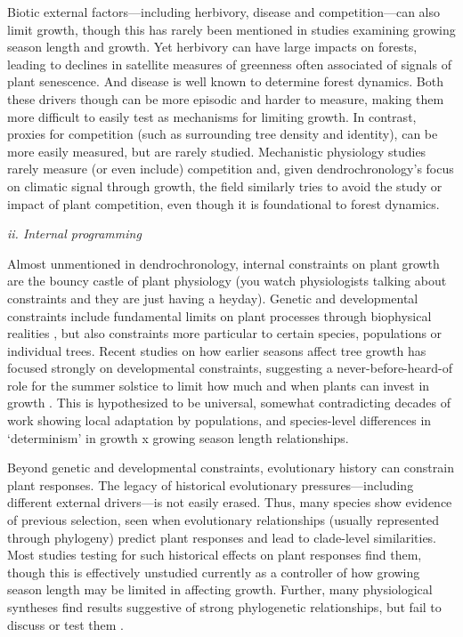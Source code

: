 \documentclass[11pt]{article}
\begin{document}
Biotic external factors---including herbivory, disease and competition---can also limit growth, though this has rarely been mentioned in studies examining growing season length and growth. Yet herbivory can have large impacts on forests, leading to declines in satellite measures of greenness often associated of signals of plant senescence. And disease is well known to determine forest dynamics. Both these drivers though can be more episodic and harder to measure, making them more difficult to easily test as mechanisms for limiting growth. In contrast, proxies for competition (such as surrounding tree density and identity), can be more easily measured, but are rarely studied. Mechanistic physiology studies rarely measure (or even include) competition and, given dendrochronology's focus on climatic signal through growth, the field similarly tries to avoid the study or impact of plant competition, even though it is foundational to forest dynamics. 

\emph{ii. Internal programming}

Almost unmentioned in dendrochronology, internal constraints on plant growth are the bouncy castle of plant physiology (you watch physiologists talking about constraints and they are just having a heyday). Genetic and developmental constraints include fundamental limits on plant processes through biophysical realities \citep[e.g., allometry, chemical reaction limits, and genetic architecture that may limit what trait combinations are possible,][]{ackerly2000evolution}, but also constraints more particular to certain species, populations or individual trees. Recent studies on how earlier seasons affect tree growth has focused strongly on developmental constraints, suggesting a never-before-heard-of role for the summer solstice to limit how much and when plants can invest in growth \citep{zohner2023effect}. This is hypothesized to be universal, somewhat contradicting decades of work showing local adaptation by populations, and species-level differences in `determinism' in growth x growing season length relationships. 

Beyond genetic and developmental constraints, evolutionary history can constrain plant responses. The legacy of historical evolutionary pressures---including different external drivers---is not easily erased.  Thus, many species show evidence of previous selection, seen when evolutionary relationships (usually represented through phylogeny) predict plant responses and lead to clade-level similarities. Most studies testing for such historical effects on plant responses find them, though this is effectively unstudied currently as a controller of how growing season length may be limited in affecting growth. Further, many physiological syntheses find results suggestive of strong phylogenetic relationships, but fail to discuss or test them \citep[e.g., discussions of evergreen versus deciduous phenology without testing for whether this is actually correlated with the deep in time split between gymnosperms and angiosperms,][]{way2010differential}. 
\end{document}

